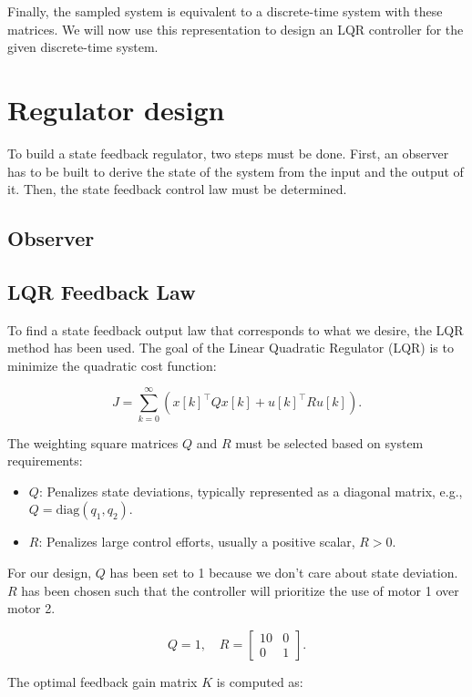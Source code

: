 Finally, the sampled system is equivalent to a discrete-time system with these matrices. We will now use this representation to design an LQR controller for the given discrete-time system.

\section{Regulator design}

To build a state feedback regulator, two steps must be done. First, an observer has to be built to derive the state of 
the system from the input and the output of it. Then, the state feedback control law must be determined.

\subsection{Observer}


\subsection{LQR Feedback Law}

To find a state feedback output law that corresponds to what we desire, the LQR method has been used.
The goal of the Linear Quadratic Regulator (LQR) is to minimize the quadratic cost function:

\[
J = \sum_{k=0}^\infty \left( x[k]^\top Q x[k] + u[k]^\top R u[k] \right).
\]

The weighting square matrices \( Q \) and \( R \) must be selected based on system requirements:

\begin{itemize}
    \item \( Q \): Penalizes state deviations, typically represented as a diagonal matrix, e.g., \( Q = \text{diag}(q_1, q_2) \).
    \item \( R \): Penalizes large control efforts, usually a positive scalar, \( R > 0 \).
\end{itemize}

For our design, $Q$ has been set to 1 because we don't care about state deviation. $R$ has been chosen such that the 
controller will prioritize the use of motor 1 over motor 2. 

\[
Q = 1, \quad
R = \begin{bmatrix}
10 & 0 \\
0 & 1
\end{bmatrix}.
\]

The optimal feedback gain matrix \( K \) is computed as:

